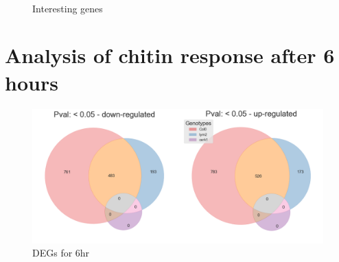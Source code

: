 \documentclass[../main.tex]{subfiles}
\begin{document}
\begin{figure}[!ht]
  \centering
  \\
  \caption{Interesting genes}
  \label{fig:interestinggenes}
\end{figure}





\section{Analysis of chitin response after 6 hours}
\label{subsec:deg6}



\begin{figure}[ht]
  \centering
  \includegraphics[width=\columnwidth]{figures/vennTreatmentschitin6.png}
  \caption{\label{fig:6hrDEGs} DEGs for 6hr}
\end{figure}
\end{document}
